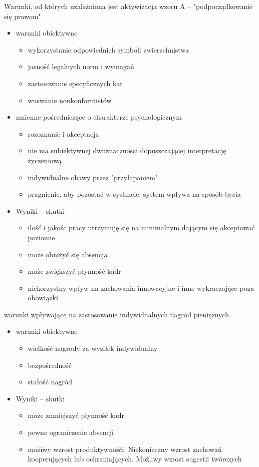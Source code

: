 \documentclass[a4paper,10pt]{report}
\begin{document}
\noindent Warunki, od których uzależniona jest aktywizacja wzoru A -- "podporządkowanie się prawom"

\begin{itemize}
	\item warunki obiektywne
	\begin{itemize}
		\item wykorzystanie odpowiednich symboli zwierzchnistwa
		\item jasność legalnych norm i wymagań
		\item zastosowanie specyficznych kar
		\item wuswanie nonkonformistów
	\end{itemize}
	\item zmienne pośredniczące  o charakterze psychologicznym
	\begin{itemize}
		\item rozoznanie i akceptacja
		\item nie ma subiektywnej dwuznaczności dopuszczającej interpretację życzeniową
		\item indywidualne obawy przez "przyłapaniem"
		\item pragnienie, aby pozostać w systmeie: system wpływa na sposób bycia
	\end{itemize}
	\item Wyniki -- skutki
	\begin{itemize}
		\item ilość i jakośc pracy utrzymuję się na minimalnym dającym się akceptować poziomie
		\item może obniżyć się absencja
		\item może zwiększyć płynność kadr
		\item niekorzystny wpływ na zachowania innowacyjne i inne wykraczające poza obowiązki
	\end{itemize}
\end{itemize}

\noindent warunki wpływające na zastosowanie indywidualnych nagród pienięznych
\begin{itemize}
	\item warunki obiektywne
	\begin{itemize}
		\item wielkość nagrody za wysiłek indywidualny
		\item bezpośredność
		\item stałość nagród
	\end{itemize}
	\item Wyniki -- skutki
	\begin{itemize}
		\item może zmniejszyć płynność kadr
		\item pewne ograniczenie absencji
		\item możiwy wzrost produktywnośći. Niekonieczny wzrost zachowań kooperujących lub ochraniających. Możliwy wzrost sugestii twórczych
	\end{itemize}	
\end{itemize}
\end{document}
